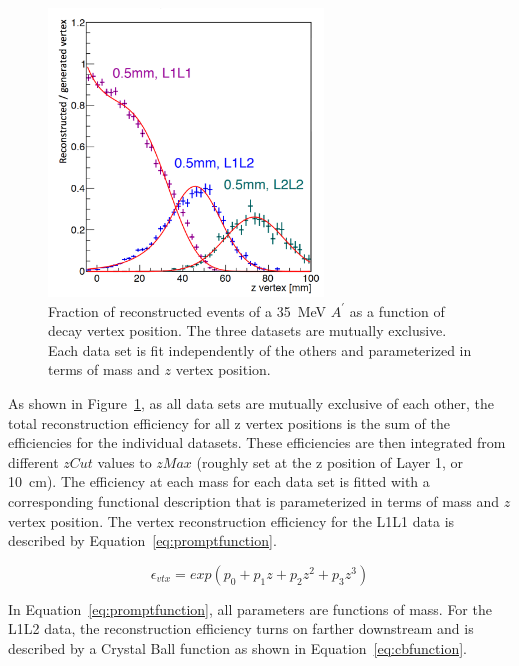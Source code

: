 \begin{figure}[htb]
  \centering
      \includegraphics[width=0.65\textwidth]{pics/searching/reconstructedVtx.png}
  \caption[Fraction of reconstructed events of a 35~MeV $A^{\prime}$ as a function of decay vertex position]{Fraction of reconstructed events of a 35~MeV $A^{\prime}$ as a function of decay vertex position. The three datasets are mutually exclusive. Each data set is fit independently of the others and parameterized in terms of mass and $z$ vertex position. }
  \label{fig:apEff}
\end{figure} 

As shown in Figure~\ref{fig:apEff}, as all data sets are mutually exclusive of each other, the total reconstruction efficiency for all z vertex positions is the sum of the efficiencies for the individual datasets. These efficiencies are then integrated from different $zCut$ values to $zMax$ (roughly set at the z position of Layer 1, or 10~cm). The efficiency at each mass for each data set is fitted with a corresponding functional description that is parameterized in terms of mass and $z$ vertex position. The vertex reconstruction efficiency for the L1L1 data is described by Equation~\eqref{eq:promptfunction}.

\begin{equation}
\label{eq:promptfunction}
\epsilon_{vtx} = exp(p_0+p_1z+p_2z^2+p_3z^3) 
\end{equation}

In Equation~\eqref{eq:promptfunction}, all parameters are functions of mass. For the L1L2 data, the reconstruction efficiency turns on farther downstream and is described by a Crystal Ball function as shown in Equation~\eqref{eq:cbfunction}.

